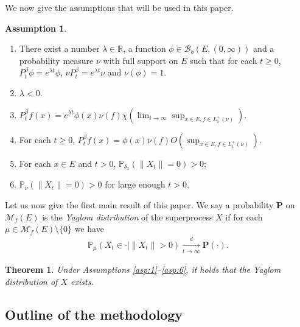 \documentclass[12pt,a4paper]{amsart}
\numberwithin{equation}{section}
\theoremstyle{plain}
\newtheorem{thm}{Theorem}[section]
\theoremstyle{definition}
\newtheorem*{asp*}{Assumption}
\theoremstyle{remark}
\begin{document}
We now give the assumptions that will be used in this paper.
\begin{asp*}
  \begin{enumerate}[label=(A\arabic*)]
  \item \label{asp:1} There exist a number $\lambda \in \mathbb R$, a function $\phi \in \mathcal B_b(E, (0,\infty))$ and a probability measure $\nu$ with full support on $E$ such that for each $t\geq 0$, $P_t^\beta \phi = e^{\lambda t} \phi$, $\nu P^\beta_t = e^{\lambda t} \nu$ and $\nu(\phi) = 1$.
	\item \label{asp:2} $\lambda < 0$.
  \item \label{asp:3} $P_t^\beta f(x) = e^{\lambda t} \phi(x) \nu(f) \chi(\lim_{t\to \infty} \sup_{x\in E, f\in L_1^+(\nu)}).$
	\item \label{asp:4}	For each $t\geq 0$, $ P_t^\beta f(x) = \phi(x) \nu(f) O(\sup_{x\in E, f\in L_1^+(\nu)}).$
	\item \label{asp:5} For each $x\in E$ and $t > 0$, $\mathbb P_{\delta_x}(\|X_t\| = 0)>0$;
	\item \label{asp:6}	$\mathbb P_\nu (\|X_t\| = 0) > 0$ for large enough $t>0$.
  \end{enumerate}
\end{asp*}

Let us now give the first main result of this paper. We say a probability ${\mathbf P}$ on $\mathcal M_f(E)$ is the \emph{Yaglom distribution} of the superprocess $X$ if for each $\mu\in \mathcal M_f(E)\setminus\{0\}$ we have
\begin{align}
\mathbb P_\mu(X_t \in \cdot | \|X_t\|>0) 
\xrightarrow[t\to \infty]{d} {\mathbf P}(\cdot).
\end{align}
\begin{thm} \label{::Y}
	Under Assumptions \ref{asp:1}--\ref{asp:6}, it holds that the Yaglom distribution of $X$ exists.
\end{thm}
\subsection{Outline of the methodology}
\end{document}
